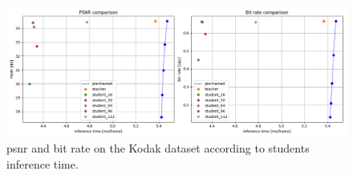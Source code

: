 \documentclass{article}
\begin{document}
\begin{figure}
  \centering
  \includegraphics[width=15cm]{../img/kd_lic_time.png}
  \caption[\acrshort{psnr} and bit rate on the Kodak dataset according to students inference time.]{\acrshort{psnr} and bit rate on the Kodak dataset according to students inference time.}
  \label{appendix:kd_lic_time}
\end{figure}
\end{document}
